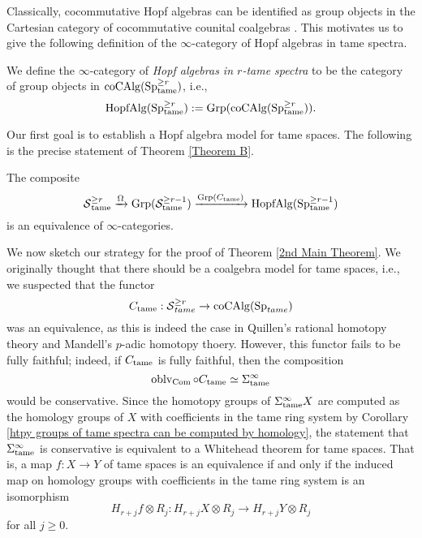 Classically, cocommutative Hopf algebras can be identified as group objects in the Cartesian category of cocommutative counital coalgebras \cite{Milnor-Moore}. This motivates us to give the following definition of the  $\infty$-category of Hopf algebras in tame spectra. 
\begin{definition}
\label{tame Hopf algebras}
    We define the $\infty$-category of \emph{Hopf algebras in $r$-tame spectra} to be the category of group objects in $\operatorname{coCAlg}(\operatorname{Sp}^{\geq r}_{\operatorname{\operatorname{tame}}})$, i.e., 
    $$
    \operatorname{HopfAlg}(\operatorname{Sp}^{\geq r}_{\operatorname{\operatorname{tame}}}):= \operatorname{Grp}(\operatorname{coCAlg}(\operatorname{Sp}^{\geq r}_{\operatorname{\operatorname{tame}}})).
    $$
\end{definition}	

Our first goal is to establish a Hopf algebra model for tame spaces. The following is the precise statement of Theorem \ref{Theorem B}.
\begin{theorem}
\label{2nd Main Theorem}
The composite
$$
\operatorname{\mathcal{S}}^{\geq r}_{\operatorname{\operatorname{tame}}} \xrightarrow{\Omega}
\operatorname{Grp}({\mathcal{S}}^{\geq r-1}_{\operatorname{\operatorname{tame}}})
\xrightarrow{\operatorname{Grp}(C_{\operatorname{\operatorname{tame}}})}
\operatorname{HopfAlg}(\operatorname{Sp}^{\geq r-1}_{\operatorname{\operatorname{tame}}})
$$
is an equivalence of $\infty$-categories.
\end{theorem}

We now sketch our strategy for the proof of Theorem \ref{2nd Main Theorem}.
We originally thought that there should be a coalgebra model for tame spaces, i.e., 
we suspected that the functor
	$$
	C_{\operatorname{tame}}:\operatorname{\mathcal{S}}^{\geq r}_{tame}\to \operatorname{coCAlg}(\operatorname{Sp}_{tame})
	$$
	was an equivalence, as this is indeed the case in Quillen's rational homotopy theory and Mandell's $p$-adic homotopy thoery. However, this functor fails to be fully faithful; indeed, if $C_{\operatorname{\operatorname{tame}}}$ is fully faithful, then the composition 
	$$
	\operatorname{oblv}_{\operatorname{Com}}\circ C_{\operatorname{\operatorname{tame}}}\simeq \Sigma^{\infty}_{\operatorname{\operatorname{tame}}}
	$$
	would be conservative. 
	Since the homotopy groups of $\Sigma^{\infty}_{\operatorname{\operatorname{tame}}}X$ are computed as the homology groups of $X$ with coefficients in the tame ring system by Corollary \ref{htpy groups of tame spectra can be computed by homology}, the statement that
	$\Sigma^{\infty}_{\operatorname{\operatorname{tame}}}$ is conservative is equivalent to a Whitehead theorem for tame spaces.
	That is, a map $f:X \to Y$ of tame spaces is an equivalence if and only if the induced map on homology groups with coefficients in the tame ring system is an isomorphism
	$$
	H_{r+j}f\otimes R_j:
	H_{r+j}X \otimes R_j
	\to 
	H_{r+j}Y \otimes R_j
	$$
	for all $j\geq 0$.
	
